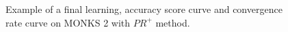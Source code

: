 \begin{appendices}
\begin{figure}[H]
\begin{subfigure}{0.40\textwidth}
                    \label{fig:monks_2_ACC_CGD}
                \end{subfigure}
                \begin{subfigure}{0.40\textwidth}
                    \caption{}
                    \label{fig:monks_2_NORM_CGD}
                \end{subfigure}
                \caption{Example of a final learning, accuracy score curve and
                convergence rate curve on MONKS 2  with $PR^+$ method.}
                \label{fig:monks_2_CGD}
            \end{figure}


\end{appendices}
